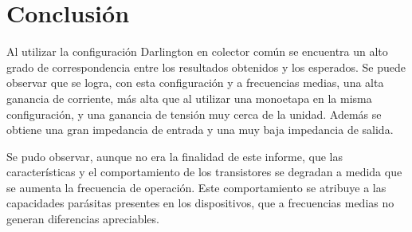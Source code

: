 \section{Conclusi\'on}

Al utilizar la configuraci\'on Darlington en colector com\'un se encuentra un alto grado de correspondencia entre los resultados obtenidos y los esperados. Se puede observar que se logra, con esta configuraci\'on y a frecuencias medias, una alta ganancia de corriente, m\'as alta que al utilizar una monoetapa en la misma configuraci\'on, y una ganancia de tensi\'on muy cerca de la unidad. Adem\'as se obtiene una gran impedancia de entrada y una muy baja impedancia de salida.

Se pudo observar, aunque no era la finalidad de este informe, que las caracter\'isticas y el comportamiento de los transistores se degradan a medida que se aumenta la frecuencia de operaci\'on. Este comportamiento se atribuye a las capacidades par\'asitas presentes en los dispositivos, que a frecuencias medias no generan diferencias apreciables.